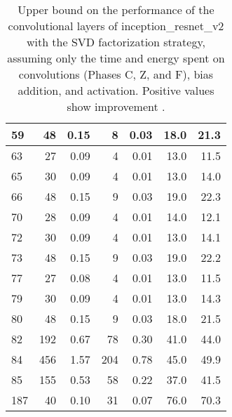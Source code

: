 \begin{table}
\begin{tabular}{|l|r|r|r|r|r|r|}
59 & 48 & 0.15 & 8 & 0.03 & 18.0 & 21.3 \\\hline
63 & 27 & 0.09 & 4 & 0.01 & 13.0 & 11.5 \\\hline
65 & 30 & 0.09 & 4 & 0.01 & 13.0 & 14.0 \\\hline
66 & 48 & 0.15 & 9 & 0.03 & 19.0 & 22.3 \\\hline
70 & 28 & 0.09 & 4 & 0.01 & 14.0 & 12.1 \\\hline
72 & 30 & 0.09 & 4 & 0.01 & 13.0 & 14.1 \\\hline
73 & 48 & 0.15 & 9 & 0.03 & 19.0 & 22.2 \\\hline
77 & 27 & 0.08 & 4 & 0.01 & 13.0 & 11.5 \\\hline
79 & 30 & 0.09 & 4 & 0.01 & 13.0 & 14.3 \\\hline
80 & 48 & 0.15 & 9 & 0.03 & 18.0 & 21.5 \\\hline
82 & 192 & 0.67 & 78 & 0.30 & 41.0 & 44.0 \\\hline
84 & 456 & 1.57 & 204 & 0.78 & 45.0 & 49.9 \\\hline
85 & 155 & 0.53 & 58 & 0.22 & 37.0 & 41.5 \\\hline
187 & 40 & 0.10 & 31 & 0.07 & 76.0 & 70.3 \\\hline
\end{tabular}
\caption{Upper bound on the performance of the convolutional layers of inception\_resnet\_v2 with the SVD factorization strategy, assuming only the time and energy spent on convolutions (Phases C, Z, and F), bias addition, and activation. Positive values show improvement
.}
\label{inception_resnet_v2-max-performance}
\end{table}
